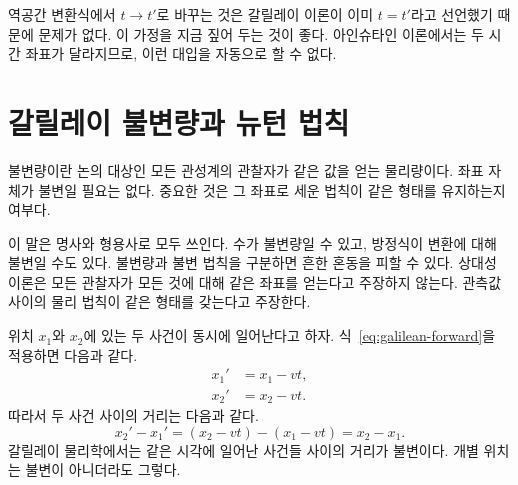 역공간 변환식에서 \(t\to t'\)로 바꾸는 것은 갈릴레이 이론이 이미 \(t=t'\)라고 선언했기 때문에 문제가 없다. 이 가정을 지금 짚어 두는 것이 좋다. 아인슈타인 이론에서는 두 시간 좌표가 달라지므로, 이런 대입을 자동으로 할 수 없다.

\begin{classroomqa}
\end{classroomqa}

\section{갈릴레이 불변량과 뉴턴 법칙}

불변량이란 논의 대상인 모든 관성계의 관찰자가 같은 값을 얻는 물리량이다. 좌표 자체가 불변일 필요는 없다. 중요한 것은 그 좌표로 세운 법칙이 같은 형태를 유지하는지 여부다.

이 말은 명사와 형용사로 모두 쓰인다. 수가 불변량일 수 있고, 방정식이 변환에 대해 불변일 수도 있다. 불변량과 불변 법칙을 구분하면 흔한 혼동을 피할 수 있다. 상대성 이론은 모든 관찰자가 모든 것에 대해 같은 좌표를 얻는다고 주장하지 않는다. 관측값 사이의 물리 법칙이 같은 형태를 갖는다고 주장한다.

위치 \(x_1\)와 \(x_2\)에 있는 두 사건이 동시에 일어난다고 하자. 식~\eqref{eq:galilean-forward}을 적용하면 다음과 같다.
\begin{align}
x_1'&=x_1-vt,\\
x_2'&=x_2-vt.
\end{align}
따라서 두 사건 사이의 거리는 다음과 같다.
\begin{equation}
x_2'-x_1'=(x_2-vt)-(x_1-vt)=x_2-x_1.
\end{equation}
갈릴레이 물리학에서는 같은 시각에 일어난 사건들 사이의 거리가 불변이다. 개별 위치는 불변이 아니더라도 그렇다.

